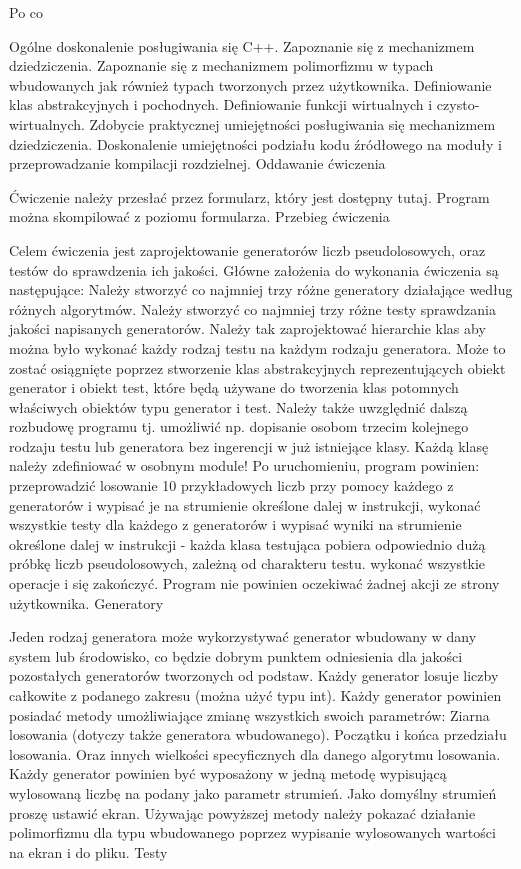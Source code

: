 Po co

Ogólne doskonalenie posługiwania się C++. Zapoznanie się z mechanizmem dziedziczenia. Zapoznanie się z mechanizmem polimorfizmu w typach wbudowanych jak również typach tworzonych przez użytkownika. Definiowanie klas abstrakcyjnych i pochodnych. Definiowanie funkcji wirtualnych i czysto-\/wirtualnych. Zdobycie praktycznej umiejętności posługiwania się mechanizmem dziedziczenia. Doskonalenie umiejętności podziału kodu źródłowego na moduły i przeprowadzanie kompilacji rozdzielnej. Oddawanie ćwiczenia

Ćwiczenie należy przesłać przez formularz, który jest dostępny tutaj. Program można skompilować z poziomu formularza. Przebieg ćwiczenia

Celem ćwiczenia jest zaprojektowanie generatorów liczb pseudolosowych, oraz testów do sprawdzenia ich jakości. Główne założenia do wykonania ćwiczenia są następujące\+: Należy stworzyć co najmniej trzy różne generatory działające według różnych algorytmów. Należy stworzyć co najmniej trzy różne testy sprawdzania jakości napisanych generatorów. Należy tak zaprojektować hierarchie klas aby można było wykonać każdy rodzaj testu na każdym rodzaju generatora. Może to zostać osiągnięte poprzez stworzenie klas abstrakcyjnych reprezentujących obiekt generator i obiekt test, które będą używane do tworzenia klas potomnych właściwych obiektów typu generator i test. Należy także uwzględnić dalszą rozbudowę programu tj. umożliwić np. dopisanie osobom trzecim kolejnego rodzaju testu lub generatora bez ingerencji w już istniejące klasy. Każdą klasę należy zdefiniować w osobnym module! Po uruchomieniu, program powinien\+: przeprowadzić losowanie 10 przykładowych liczb przy pomocy każdego z generatorów i wypisać je na strumienie określone dalej w instrukcji, wykonać wszystkie testy dla każdego z generatorów i wypisać wyniki na strumienie określone dalej w instrukcji -\/ każda klasa testująca pobiera odpowiednio dużą próbkę liczb pseudolosowych, zależną od charakteru testu. wykonać wszystkie operacje i się zakończyć. Program nie powinien oczekiwać żadnej akcji ze strony użytkownika. Generatory

Jeden rodzaj generatora może wykorzystywać generator wbudowany w dany system lub środowisko, co będzie dobrym punktem odniesienia dla jakości pozostałych generatorów tworzonych od podstaw. Każdy generator losuje liczby całkowite z podanego zakresu (można użyć typu int). Każdy generator powinien posiadać metody umożliwiające zmianę wszystkich swoich parametrów\+: Ziarna losowania (dotyczy także generatora wbudowanego). Początku i końca przedziału losowania. Oraz innych wielkości specyficznych dla danego algorytmu losowania. Każdy generator powinien być wyposażony w jedną metodę wypisującą wylosowaną liczbę na podany jako parametr strumień. Jako domyślny strumień proszę ustawić ekran. Używając powyższej metody należy pokazać działanie polimorfizmu dla typu wbudowanego poprzez wypisanie wylosowanych wartości na ekran i do pliku. Testy

